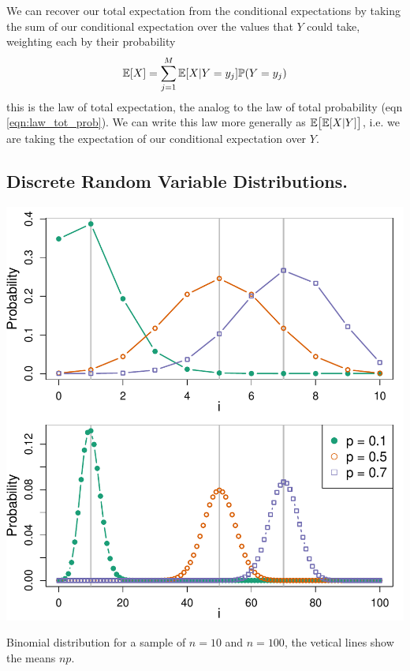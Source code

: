 We can recover our total expectation from the conditional expectations
by taking the sum of our conditional expectation over the values that
$Y$ could take, weighting each by their probability
\begin{equation} 
\mathbb{E}[X] = \sum_{j=1}^M \mathbb{E}[X|Y=y_j] \mathbb{P}(Y=y_j)
 \end{equation}
this is the law of total expectation, the analog to the law of total
probability (eqn \eqref{eqn:law_tot_prob}). We can write this law more
generally as $\mathbb{E} \big[\mathbb{E}[X|Y]\big]$, i.e. we are taking the
expectation of our conditional expectation over $Y$. 
 
\subsection{Discrete Random Variable Distributions.}

 \begin{marginfigure}
 \begin{center}
   \includegraphics[width=\textwidth]{math_background/dist_pics/Binomial.pdf}\end{center}
 \caption{Binomial distribution for a sample of $n=10$ and $n=100$,
   the vetical lines show the means $np$. }\label{Fig:binomial}
 \end{marginfigure}

